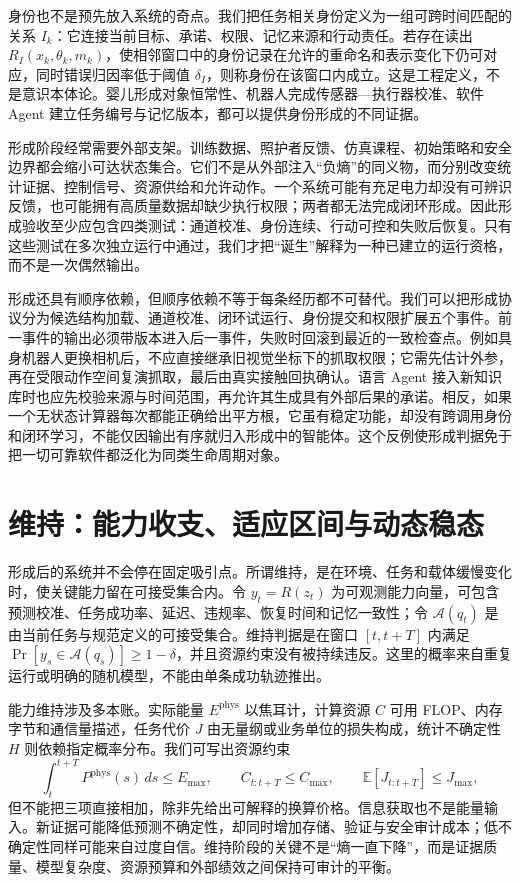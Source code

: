 身份也不是预先放入系统的奇点。我们把任务相关身份定义为一组可跨时间匹配的关系 $I_k$：它连接当前目标、承诺、权限、记忆来源和行动责任。若存在读出 $R_I(x_k,\theta_k,m_k)$，使相邻窗口中的身份记录在允许的重命名和表示变化下仍可对应，同时错误归因率低于阈值 $\delta_I$，则称身份在该窗口内成立。这是工程定义，不是意识本体论。婴儿形成对象恒常性、机器人完成传感器—执行器校准、软件 Agent 建立任务编号与记忆版本，都可以提供身份形成的不同证据。

形成阶段经常需要外部支架。训练数据、照护者反馈、仿真课程、初始策略和安全边界都会缩小可达状态集合。它们不是从外部注入“负熵”的同义物，而分别改变统计证据、控制信号、资源供给和允许动作。一个系统可能有充足电力却没有可辨识反馈，也可能拥有高质量数据却缺少执行权限；两者都无法完成闭环形成。因此形成验收至少应包含四类测试：通道校准、身份连续、行动可控和失败后恢复。只有这些测试在多次独立运行中通过，我们才把“诞生”解释为一种已建立的运行资格，而不是一次偶然输出。

形成还具有顺序依赖，但顺序依赖不等于每条经历都不可替代。我们可以把形成协议分为候选结构加载、通道校准、闭环试运行、身份提交和权限扩展五个事件。前一事件的输出必须带版本进入后一事件，失败时回滚到最近的一致检查点。例如具身机器人更换相机后，不应直接继承旧视觉坐标下的抓取权限；它需先估计外参，再在受限动作空间复演抓取，最后由真实接触回执确认。语言 Agent 接入新知识库时也应先校验来源与时间范围，再允许其生成具有外部后果的承诺。相反，如果一个无状态计算器每次都能正确给出平方根，它虽有稳定功能，却没有跨调用身份和闭环学习，不能仅因输出有序就归入形成中的智能体。这个反例使形成判据免于把一切可靠软件都泛化为同类生命周期对象。

\section{维持：能力收支、适应区间与动态稳态}
\label{sec:abidance}

形成后的系统并不会停在固定吸引点。所谓维持，是在环境、任务和载体缓慢变化时，使关键能力留在可接受集合内。令 $y_t=R(z_t)$ 为可观测能力向量，可包含预测校准、任务成功率、延迟、违规率、恢复时间和记忆一致性；令 $\mathcal A(q_t)$ 是由当前任务与规范定义的可接受集合。维持判据是在窗口 $[t,t+T]$ 内满足 $\Pr[y_s\in\mathcal A(q_s)]\ge 1-\delta$，并且资源约束没有被持续违反。这里的概率来自重复运行或明确的随机模型，不能由单条成功轨迹推出。

能力维持涉及多本账。实际能量 $E^{\mathrm{phys}}$ 以焦耳计，计算资源 $C$ 可用 FLOP、内存字节和通信量描述，任务代价 $J$ 由无量纲或业务单位的损失构成，统计不确定性 $H$ 则依赖指定概率分布。我们可写出资源约束
\begin{equation}
    \int_t^{t+T} P^{\mathrm{phys}}(s)\,ds\le E_{\max},\qquad
    C_{t:t+T}\le C_{\max},\qquad
    \mathbb E[J_{t:t+T}]\le J_{\max},
\end{equation}
但不能把三项直接相加，除非先给出可解释的换算价格。信息获取也不是能量输入。新证据可能降低预测不确定性，却同时增加存储、验证与安全审计成本；低不确定性同样可能来自过度自信。维持阶段的关键不是“熵一直下降”，而是证据质量、模型复杂度、资源预算和外部绩效之间保持可审计的平衡。

